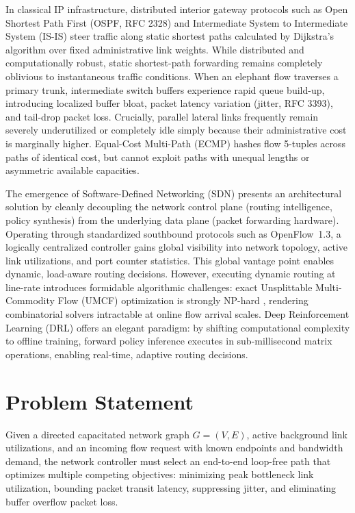 \documentclass[12pt,a4paper,oneside]{report}
\begin{document}
In classical IP infrastructure, distributed interior gateway protocols such as Open Shortest Path First (OSPF, RFC 2328) \cite{moy1998ospf} and Intermediate System to Intermediate System (IS-IS) steer traffic along static shortest paths calculated by Dijkstra's algorithm over fixed administrative link weights. While distributed and computationally robust, static shortest-path forwarding remains completely oblivious to instantaneous traffic conditions. When an elephant flow traverses a primary trunk, intermediate switch buffers experience rapid queue build-up, introducing localized buffer bloat, packet latency variation (jitter, RFC 3393), and tail-drop packet loss. Crucially, parallel lateral links frequently remain severely underutilized or completely idle simply because their administrative cost is marginally higher. Equal-Cost Multi-Path (ECMP) hashes flow 5-tuples across paths of identical cost, but cannot exploit paths with unequal lengths or asymmetric available capacities.

The emergence of Software-Defined Networking (SDN) \cite{mckeown2008openflow,onf2012openflow} presents an architectural solution by cleanly decoupling the network control plane (routing intelligence, policy synthesis) from the underlying data plane (packet forwarding hardware). Operating through standardized southbound protocols such as OpenFlow~1.3, a logically centralized controller gains global visibility into network topology, active link utilizations, and port counter statistics. This global vantage point enables dynamic, load-aware routing decisions. However, executing dynamic routing at line-rate introduces formidable algorithmic challenges: exact Unsplittable Multi-Commodity Flow (UMCF) optimization is strongly NP-hard \cite{even1975complexity}, rendering combinatorial solvers intractable at online flow arrival scales. Deep Reinforcement Learning (DRL) offers an elegant paradigm: by shifting computational complexity to offline training, forward policy inference executes in sub-millisecond matrix operations, enabling real-time, adaptive routing decisions.

\section{Problem Statement}
Given a directed capacitated network graph $G = (V, E)$, active background link utilizations, and an incoming flow request with known endpoints and bandwidth demand, the network controller must select an end-to-end loop-free path that optimizes multiple competing objectives: minimizing peak bottleneck link utilization, bounding packet transit latency, suppressing jitter, and eliminating buffer overflow packet loss.
\end{document}
